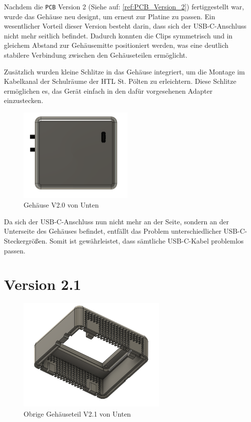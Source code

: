 \begin{inhalt}
Nachdem die \texttt{PCB} Version 2 (Siehe auf: \ref{ref:PCB_Version_2}) fertiggestellt war, wurde das Gehäuse neu designt, um erneut zur Platine zu passen.  
Ein wesentlicher Vorteil dieser Version besteht darin, dass sich der USB-C-Anschluss nicht mehr seitlich befindet.  
Dadurch konnten die Clips symmetrisch und in gleichem Abstand zur Gehäusemitte positioniert werden, was eine deutlich stabilere Verbindung zwischen den Gehäuseteilen ermöglicht.
 

\vspace{0.15cm}

Zusätzlich wurden kleine Schlitze in das Gehäuse integriert, um die Montage im Kabelkanal der Schulräume der HTL St. Pölten zu erleichtern.  
Diese Schlitze ermöglichen es, das Gerät einfach in den dafür vorgesehenen Adapter einzustecken.


\begin{figure}[!htb]
\centering
\includegraphics[width=0.5\textwidth]{files/Thomas/pics/geheause/2.0/gehaeuse_bot.png}
\caption[Bildbezeichnung für Abbildungsverzeichnis]{Gehäuse V2.0 von Unten}
\label{fig:gehaeuse_internet_bild}
\end{figure}

Da sich der USB-C-Anschluss nun nicht mehr an der Seite, sondern an der Unterseite des Gehäuses befindet, entfällt das Problem unterschiedlicher USB-C-Steckergrößen.  
Somit ist gewährleistet, dass sämtliche USB-C-Kabel problemlos passen.


\section{Version 2.1}

\begin{figure}[!htb]
\centering
\includegraphics[width=0.65\textwidth]{files/Thomas/pics/geheause/2.1/gehaeuse_side.png}
\caption[Bildbezeichnung für Abbildungsverzeichnis]{Obrige Gehäuseteil V2.1 von Unten}
\label{fig:gehaeuse_internet_bild}
\end{figure}




\end{inhalt}
